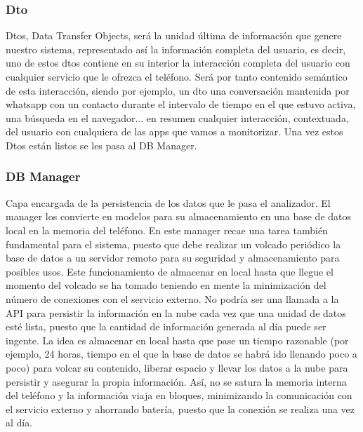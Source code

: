 \documentclass[12pt,a4paper,oneside]{book} %
\begin{document}
\subsubsection{Dto}
Dtos, Data Transfer Objects, será la unidad última de información que genere nuestro sistema, representado así la información completa del usuario, es decir, uno de estos dtos contiene en su interior la interacción completa del usuario con cualquier servicio que le ofrezca el teléfono. 
\newline
\newline
Será por tanto contenido semántico de esta interacción, siendo por ejemplo, un dto una conversación mantenida por whatsapp con un contacto durante el intervalo de tiempo en el que estuvo activa, una búsqueda en el navegador... en resumen cualquier interacción, contextuada, del usuario con cualquiera de las apps que vamos a monitorizar. 
\newline
\newline 
Una vez estos Dtos están listos se les pasa al DB Manager. 
\subsubsection{DB Manager}
Capa encargada de la persistencia de los datos que le pasa el analizador. El manager los convierte en modelos para su almacenamiento en una base de datos local en la memoria del teléfono. 
\newline 
\newline 
En este manager recae una tarea también fundamental para el sistema, puesto que debe realizar un volcado periódico la base de datos a un servidor remoto para su seguridad y almacenamiento para posibles usos. Este funcionamiento de almacenar en local hasta que llegue el momento del volcado se ha tomado teniendo en mente la minimización del número de conexiones con el servicio externo. No podría ser una llamada a la API para persistir la información en la nube cada vez que una unidad de datos esté lista, puesto que la cantidad de información generada al día puede ser ingente. 
\newline \newline
La idea es almacenar en local hasta que pase un tiempo razonable (por ejemplo, 24 horas, tiempo en el que la base de datos se habrá ido llenando poco a poco) para volcar su contenido, liberar espacio y llevar los datos a la nube para persistir y asegurar la propia información. Así, no se satura la memoria interna del teléfono y la información viaja en bloques, minimizando la comunicación con el servicio externo y ahorrando batería, puesto que la conexión se realiza una vez al día. 
\newpage
\end{document}
